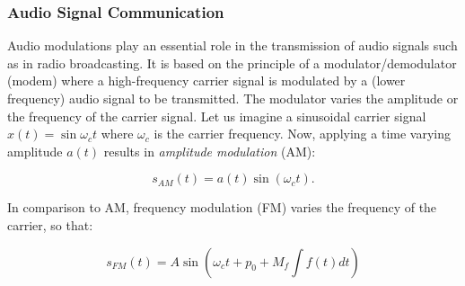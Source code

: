 \subsubsection*{Audio Signal Communication}

Audio modulations play an essential role in the transmission of audio signals such as in radio broadcasting.
It is based on the principle of a modulator/demodulator (modem) where a high-frequency carrier signal is modulated by a (lower frequency) audio signal to be transmitted.
The modulator varies the amplitude or the frequency of the carrier signal.
Let us imagine a sinusoidal carrier signal $x(t) = \sin \omega_c t$ where $\omega_c$ is the carrier frequency. Now, applying a time varying amplitude $a(t)$ results in \emph{amplitude modulation} (AM):


\begin{equation*}
    s_{AM}(t) = a(t) \sin \left( \omega_{c} t\right).    
\end{equation*}

In comparison to AM, frequency modulation (FM) varies the frequency of the carrier, so that:

\begin{equation*}
    s_{FM}(t) = A \sin \left( \omega_{c} t + p_0 + M_f \int f(t) dt \right)
\end{equation*}


